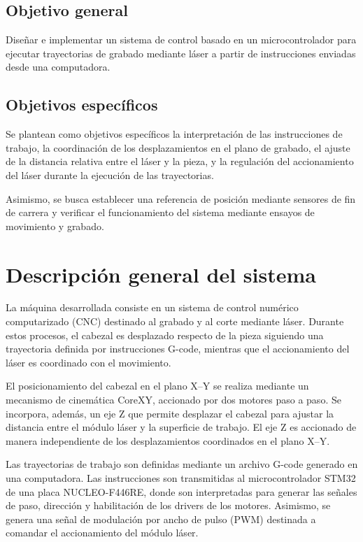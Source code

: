 \documentclass[blue,fullpaper]{ludusofficial}  %
\begin{document}
\subsection{Objetivo general}

Diseñar e implementar un sistema de control basado en
un microcontrolador para ejecutar trayectorias de grabado
mediante láser a partir de instrucciones enviadas desde
una computadora.

\subsection{Objetivos específicos}

Se plantean como objetivos específicos la interpretación
de las instrucciones de trabajo, la coordinación de los
desplazamientos en el plano de grabado, el ajuste de la
distancia relativa entre el láser y la pieza, y la regulación
del accionamiento del láser durante la ejecución de las
trayectorias.

Asimismo, se busca establecer una referencia de posición
mediante sensores de fin de carrera y verificar el
funcionamiento del sistema mediante ensayos de movimiento
y grabado.


\section{Descripción general del sistema}

La máquina desarrollada consiste en un sistema de control numérico computarizado (CNC) destinado al grabado y al corte mediante láser. Durante estos procesos, el cabezal es desplazado respecto de la pieza siguiendo una trayectoria definida por instrucciones G-code, mientras que el accionamiento del láser es coordinado con el movimiento.

El posicionamiento del cabezal en el plano X--Y se realiza mediante un mecanismo de cinemática CoreXY, accionado por dos motores paso a paso. Se incorpora, además, un eje Z que permite desplazar el cabezal para ajustar la distancia entre el módulo láser y la superficie de trabajo. El eje Z es accionado de manera independiente de los desplazamientos coordinados en el plano X--Y.

Las trayectorias de trabajo son definidas mediante un archivo G-code generado en una computadora. Las instrucciones son transmitidas al microcontrolador STM32 de una placa NUCLEO-F446RE, donde son interpretadas para generar las señales de paso, dirección y habilitación de los drivers de los motores. Asimismo, se genera una señal de modulación por ancho de pulso (PWM) destinada a comandar el accionamiento del módulo láser.
\end{document}

